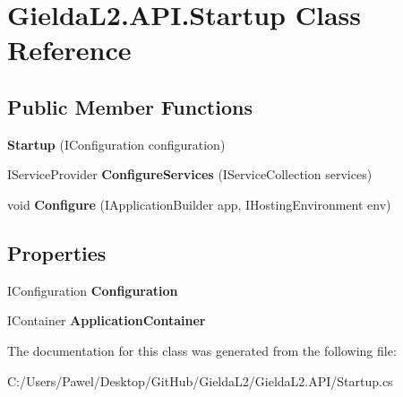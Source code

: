 \hypertarget{class_gielda_l2_1_1_a_p_i_1_1_startup}{}\section{Gielda\+L2.\+A\+P\+I.\+Startup Class Reference}
\label{class_gielda_l2_1_1_a_p_i_1_1_startup}
\subsection*{Public Member Functions}
\begin{DoxyCompactItemize}
\item 
\mbox{\label{class_gielda_l2_1_1_a_p_i_1_1_startup_aec176eb71fe537e5ee5a4ab052b2465e}} 
{\bfseries Startup} (I\+Configuration configuration)
\item 
\mbox{\label{class_gielda_l2_1_1_a_p_i_1_1_startup_ae53b8374d5cc15f6688aeb349bbb5e91}} 
I\+Service\+Provider {\bfseries Configure\+Services} (I\+Service\+Collection services)
\item 
\mbox{\label{class_gielda_l2_1_1_a_p_i_1_1_startup_a156f302642950a55e97dc96595523b56}} 
void {\bfseries Configure} (I\+Application\+Builder app, I\+Hosting\+Environment env)
\end{DoxyCompactItemize}
\subsection*{Properties}
\begin{DoxyCompactItemize}
\item 
\mbox{\label{class_gielda_l2_1_1_a_p_i_1_1_startup_a33f1a7cb4f6c4af44839ba8a3e2282a5}} 
I\+Configuration {\bfseries Configuration}
\item 
\mbox{\label{class_gielda_l2_1_1_a_p_i_1_1_startup_ad67055b415aa977d121b2a576b4956ef}} 
I\+Container {\bfseries Application\+Container}
\end{DoxyCompactItemize}


The documentation for this class was generated from the following file\+:\begin{DoxyCompactItemize}
\item 
C\+:/\+Users/\+Pawel/\+Desktop/\+Git\+Hub/\+Gielda\+L2/\+Gielda\+L2.\+A\+P\+I/Startup.\+cs\end{DoxyCompactItemize}
